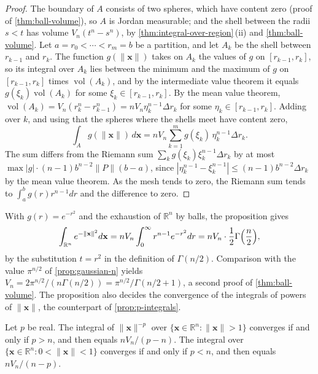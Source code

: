 \begin{proof}
The boundary of $A$ consists of two spheres, which have content zero (proof of \cref{thm:ball-volume}), so $A$ is Jordan measurable; and the shell between the radii $s<t$ has volume $V_n(t^n-s^n)$, by \cref{thm:integral-over-region}\,(ii) and \cref{thm:ball-volume}. Let $a=r_0<\cdots<r_m=b$ be a partition, and let $A_k$ be the shell between $r_{k-1}$ and $r_k$. The function $g(\|\mathbf x\|)$ takes on $A_k$ the values of $g$ on $[r_{k-1},r_k]$, so its integral over $A_k$ lies between the minimum and the maximum of $g$ on $[r_{k-1},r_k]$ times $\operatorname{vol}(A_k)$, and by the intermediate value theorem it equals $g(\xi_k)\operatorname{vol}(A_k)$ for some $\xi_k\in[r_{k-1},r_k]$. By the mean value theorem, $\operatorname{vol}(A_k)=V_n(r_k^n-r_{k-1}^n)=nV_n\eta_k^{n-1}\Delta r_k$ for some $\eta_k\in[r_{k-1},r_k]$. Adding over $k$, and using that the spheres where the shells meet have content zero,
\[
\int_Ag(\|\mathbf x\|)\,d\mathbf x=nV_n\sum_{k=1}^mg(\xi_k)\,\eta_k^{n-1}\Delta r_k .
\]
The sum differs from the Riemann sum $\sum_kg(\xi_k)\xi_k^{n-1}\Delta r_k$ by at most $\max|g|\cdot(n-1)b^{n-2}\|P\|(b-a)$, since $|\eta_k^{n-1}-\xi_k^{n-1}|\le(n-1)b^{n-2}\Delta r_k$ by the mean value theorem. As the mesh tends to zero, the Riemann sum tends to $\int_a^bg(r)r^{n-1}dr$ and the difference to zero.
\end{proof}

With $g(r)=e^{-r^2}$ and the exhaustion of $\mathbb R^n$ by balls, the proposition gives
\[
\int_{\mathbb R^n}e^{-\|\mathbf x\|^2}d\mathbf x=nV_n\int_0^\infty r^{n-1}e^{-r^2}dr=nV_n\cdot\frac12\Gamma\Bigl(\frac n2\Bigr),
\]
by the substitution $t=r^2$ in the definition of $\Gamma(n/2)$. Comparison with the value $\pi^{n/2}$ of \cref{prop:gaussian-n} yields $V_n=2\pi^{n/2}/(n\Gamma(n/2))=\pi^{n/2}/\Gamma(n/2+1)$, a second proof of \cref{thm:ball-volume}. The proposition also decides the convergence of the integrals of powers of $\|\mathbf x\|$, the counterpart of \cref{prop:p-integrals}.

\begin{corollary}
\label{cor:power-integrals-rn}
Let $p$ be real. The integral of $\|\mathbf x\|^{-p}$ over $\{\mathbf x\in\mathbb R^n: \|\mathbf x\|>1\}$ converges if and only if $p>n$, and then equals $nV_n/(p-n)$. The integral over $\{\mathbf x\in\mathbb R^n: 0<\|\mathbf x\|<1\}$ converges if and only if $p<n$, and then equals $nV_n/(n-p)$.
\end{corollary}

